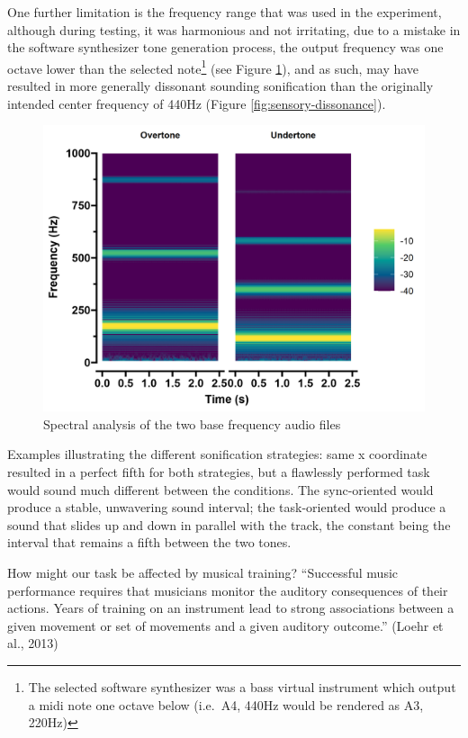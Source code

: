 \documentclass[10pt,a4paper,onecolumn]{article}
\begin{document}
One further limitation is the frequency range that was used in the experiment, although during testing, it was harmonious and not irritating, due to a mistake in the software synthesizer tone generation process, the output frequency was one octave lower than the selected note\footnote{The selected software synthesizer was a bass virtual instrument which output a midi note one octave below (i.e.~A4, 440Hz would be rendered as A3, 220Hz)} (see Figure \ref{fig:stimuli-spectra}), and as such, may have resulted in more generally dissonant sounding sonification than the originally intended center frequency of 440Hz (Figure \ref{fig:sensory-dissonance}).

\begin{figure}[h]

{\centering \includegraphics[width=1\linewidth]{figures/spec_tones} 

}

\caption{Spectral analysis of the two base frequency audio files}\label{fig:stimuli-spectra}
\end{figure}

Examples illustrating the different sonification strategies: same x coordinate resulted in a perfect fifth for both strategies, but a flawlessly performed task would sound much different between the conditions. The sync-oriented would produce a stable, unwavering sound interval; the task-oriented would produce a sound that slides up and down in parallel with the track, the constant being the interval that remains a fifth between the two tones.

How might our task be affected by musical training? ``Successful music performance requires that musicians monitor the auditory consequences of their actions. Years of training on an instrument lead to strong associations between a given movement or set of movements and a given auditory outcome.'' (Loehr et al., 2013)
\end{document}
